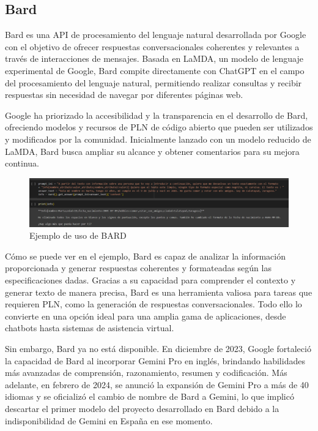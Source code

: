 \subsection{Bard}
Bard es una API de procesamiento del lenguaje natural desarrollada por Google con el objetivo de ofrecer respuestas conversacionales coherentes y relevantes a través de interacciones de mensajes. Basada en LaMDA, un modelo de lenguaje experimental de Google, Bard compite directamente con ChatGPT en el campo del procesamiento del lenguaje natural, permitiendo realizar consultas y recibir respuestas sin necesidad de navegar por diferentes páginas web.

Google ha priorizado la accesibilidad y la transparencia en el desarrollo de Bard, ofreciendo modelos y recursos de PLN de código abierto que pueden ser utilizados y modificados por la comunidad. Inicialmente lanzado con un modelo reducido de LaMDA, Bard busca ampliar su alcance y obtener comentarios para su mejora continua.

\begin{figure}[h]
	\centering
	\includegraphics[width=1\textwidth]{Imagenes/EstudioTeorico/Bard}
	\caption{Ejemplo de uso de BARD}
	\label{fig:3}
\end{figure}

Cómo se puede ver en el ejemplo, Bard es capaz de analizar la información proporcionada y generar respuestas coherentes y formateadas según las especificaciones dadas. Gracias a su capacidad para comprender el contexto y generar texto de manera precisa, Bard es una herramienta valiosa para tareas que requieren PLN, como la generación de respuestas conversacionales. Todo ello lo convierte en una opción ideal para una amplia gama de aplicaciones, desde chatbots hasta sistemas de asistencia virtual. 

Sin embargo, Bard ya no está disponible. En diciembre de 2023, Google fortaleció la capacidad de Bard al incorporar Gemini Pro en inglés, brindando habilidades más avanzadas de comprensión, razonamiento, resumen y codificación. Más adelante, en febrero de 2024, se anunció la expansión de Gemini Pro a más de 40 idiomas y se oficializó el cambio de nombre de Bard a Gemini, lo que implicó descartar el primer modelo del proyecto desarrollado en Bard debido a la indisponibilidad de Gemini en España en ese momento.

